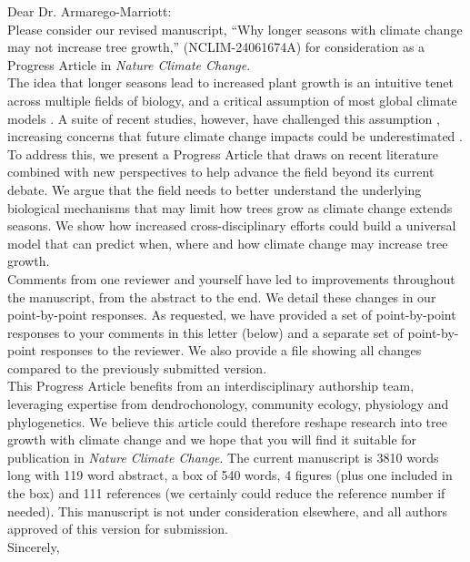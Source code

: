 \documentclass[11pt,a4paper]{article}
\begin{document}
\noindent Dear Dr. Armarego-Marriott:
\vspace{1.5ex}\\
Please consider our revised manuscript, ``Why longer seasons with climate change may not increase tree growth,'' (NCLIM-24061674A) for consideration as a Progress Article in \emph{Nature Climate Change}. 
\vspace{1.5ex}\\
The idea that longer seasons lead to increased plant growth is an intuitive tenet across multiple fields of biology, and a critical assumption of most global climate models \citep{friedlingstein2022global}. A suite of recent studies, however, have challenged this assumption \citep[e.g.][]{dow2022warm,green2022limits}, increasing concerns that future climate change impacts could be underestimated \citep{green2022limits,korner2023four}. 
\vspace{1.5ex}\\
To address this, we present a Progress Article that draws on recent literature combined with new perspectives to help advance the field beyond its current debate. We argue that the field needs to better understand the underlying biological mechanisms that may limit how trees grow as climate change extends seasons.  We show how increased cross-disciplinary efforts could build a universal model that can predict when, where and how climate change may increase tree growth. 
\vspace{1.5ex}\\
Comments from one reviewer and yourself have led to improvements throughout the manuscript, from the abstract to the end. We detail these changes in our point-by-point responses. As requested, we have provided a set of point-by-point responses to your comments in this letter (below) and a separate set of point-by-point responses to the reviewer. We also provide a file showing all changes compared to the previously submitted version.
\vspace{1.5ex}\\
This Progress Article benefits from an interdisciplinary authorship team, leveraging expertise from dendrochonology, community ecology, physiology and phylogenetics. We believe this article could therefore reshape research into tree growth with climate change and we hope that you will find it suitable for publication in \emph{Nature Climate Change}. The current manuscript is 3810 words long with 119 word abstract, a box of 540 words, 4 figures (plus one included in the box) and 111 references (we certainly could reduce the reference number if needed). This manuscript is not under consideration elsewhere, and all authors approved of this version for submission. 
\vspace{1.5ex}\\
Sincerely,\\
\end{document}
